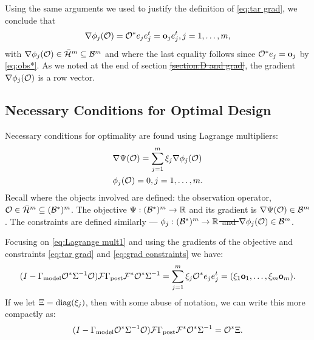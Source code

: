 \documentclass{amsart}
\numberwithin{equation}{section}
\providecommand{\DIFadd}[1]{{\protect\color{blue}\uwave{#1}}} %
\providecommand{\DIFdel}[1]{{\protect\color{red}\sout{#1}}}                      %
\providecommand{\DIFaddbegin}{} %
\providecommand{\DIFaddend}{} %
\providecommand{\DIFdelbegin}{} %
\providecommand{\DIFdelend}{} %
\begin{document}
\DIFaddend Using the same arguments we used to justify the definition of
\eqref{eq:tar grad}, we conclude that
\begin{align}\label{eq:grad constraints}
\nabla \phi_j(\mathcal{O}) = \mathcal{O}^* e_j e_j^t = \mathbf{o}_j e_j^t , j=1,\dots,m,
\end{align}
with \DIFdelbegin \DIFdel{$\nabla \phi_j(\mathcal{O}) \in \bar{\mathcal{H}}^m \subseteq \mathcal{B}^m$ }\DIFdelend \DIFaddbegin \DIFadd{$\nabla \phi_j(\obs) \in \hilo^m$ }\DIFaddend and where the
last equality follows since $\mathcal{O}^*e_j = \mathbf{o}_j$ by \eqref{eq:obs*}. As
we noted at the end of section \DIFdelbegin \DIFdel{\ref{section:D and grad}}\DIFdelend \DIFaddbegin \DIFadd{\ref{section:objective}}\DIFaddend , the
gradient $\nabla \phi_j(\mathcal{O})$ is a row vector.

\subsection{Necessary Conditions for Optimal Design}\label{subsec:necessary}
Necessary conditions for optimality are found using Lagrange
multipliers:
\begin{align}
  &\nabla \Psi(\mathcal{O}) = \sum_{j=1}^m \xi_j \nabla \phi_j (\mathcal{O})
  \label{eq:Lagrange mult1} \\
    &\phi_j(\mathcal{O}) = 0, j = 1,\dots,m. \label{eq:Lagrange mult2}
\end{align}
Recall where the objects involved are defined: the observation operator,
\DIFdelbegin \DIFdel{$\mathcal{O} \in \bar{\mathcal{H}}^m \subseteq (\mathcal{B}^*)^m$}\DIFdelend \DIFaddbegin \DIFadd{$\obs \in (\hilo^*)^m$}\DIFaddend . The objective \DIFdelbegin \DIFdel{$\Psi:
(\mathcal{B}^*)^m \to \mathbb{R}$ }\DIFdelend \DIFaddbegin \DIFadd{$\tar:
(\hilo^*)^m \to \R$ }\DIFaddend and its gradient is \DIFdelbegin \DIFdel{$\nabla \Psi(\mathcal{O}) \in
\mathcal{B}^m$}\DIFdelend \DIFaddbegin \DIFadd{$\nabla \tar(\obs) \in
\hilo^m$}\DIFaddend . The constraints are defined similarly --- \DIFdelbegin \DIFdel{$\phi_j: (\mathcal{B}^*)^m
\to \mathbb{R}$ and $\nabla \phi_j(\mathcal{O}) \in \mathcal{B}^m$}\DIFdelend \DIFaddbegin \DIFadd{$\phi_j: (\hilo^*)^m
\to \R$ and $\nabla \phi_j(\obs) \in \hilo^m$}\DIFaddend .

Focusing on \eqref{eq:Lagrange mult1} and using the gradients of the
objective and constraints \eqref{eq:tar grad} and \eqref{eq:grad
  constraints} we have:
\begin{equation*}
  (I - \Gamma_{\textup{model}} \mathcal{O}^* \Sigma^{-1} \mathcal{O}) \mathcal{F} \Gamma_{\textup{post}} \mathcal{F}^* \mathcal{O}^*\Sigma^{-1}
  = \sum_{j=1}^m \xi_j \mathcal{O}^* e_je_j^t = (\xi_1 \mathbf{o}_1,\dots,\xi_m \mathbf{o}_m).
\end{equation*}
If we let $\Xi = \textup{diag}(\xi_j)$, then with some abuse of
notation, we can write this more compactly as:
\begin{equation}\label{eq:conditions}
  ( I - \Gamma_{\textup{model}} \mathcal{O}^* \Sigma^{-1} \mathcal{O}) \mathcal{F} \Gamma_{\textup{post}} \mathcal{F}^* \mathcal{O}^*  \Sigma^{-1}
  = \mathcal{O}^* \Xi.
\end{equation}
\end{document}
